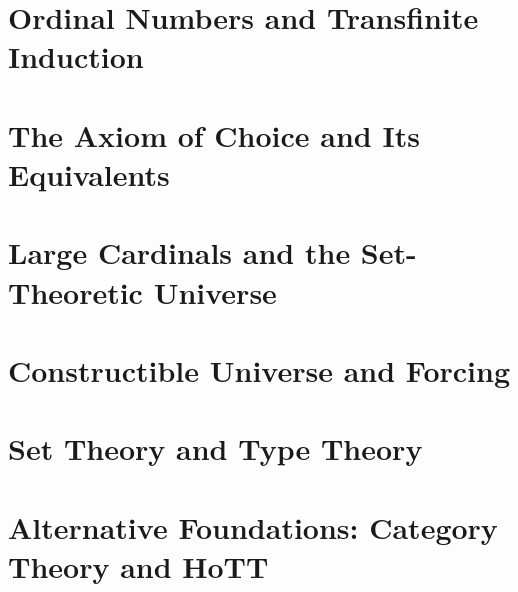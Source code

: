 \chapter{Ordinal Numbers and Transfinite Induction}
\chapter{The Axiom of Choice and Its Equivalents}
\chapter{Large Cardinals and the Set-Theoretic Universe}
\chapter{Constructible Universe and Forcing}
\chapter{Set Theory and Type Theory}
\chapter{Alternative Foundations: Category Theory and HoTT}